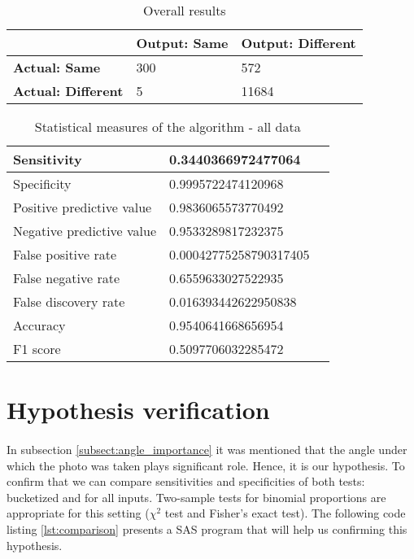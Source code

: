 \begin{table}[H]
    \centering
    \begin{spacing}{1.5}
    \begin{tabular}{|l|l|l|}
        \hline
        \cellcolor{gray} & \textbf{Output: Same} & \textbf{Output: Different} \\ [0.5ex]
        \hline\hline
        \textbf{Actual: Same} & 300 & 572 \\ [0.5ex]
        \hline
        \textbf{Actual: Different} & 5 & 11684 \\ [0.5ex]
        \hline
    \end{tabular}
    \end{spacing}
    \caption{Overall results}
    \label{tab:overall_results}
\end{table}
        
\begin{table}[H]
    \centering
    \begin{spacing}{1.5}
    \begin{tabular}{|l|l|l|}
        \hline
        Sensitivity                 & 0.3440366972477064 \\
        \hline
        Specificity                 & 0.9995722474120968 \\
        \hline
        Positive predictive value   & 0.9836065573770492 \\
        \hline
        Negative predictive value   & 0.9533289817232375 \\
        \hline
        False positive rate         & 0.00042775258790317405 \\
        \hline
        False negative rate         & 0.6559633027522935 \\
        \hline
        False discovery rate        & 0.016393442622950838 \\
        \hline
        Accuracy                    & 0.9540641668656954 \\
        \hline
        F1 score                    & 0.5097706032285472 \\
        \hline
    \end{tabular}
    \end{spacing}
    \caption{Statistical measures of the algorithm - all data}
\end{table}

\section{Hypothesis verification}
\paragraph{}
In subsection \ref{subsect:angle_importance} it was mentioned that the angle under which the photo was taken plays significant role. Hence, it is our hypothesis. To confirm that we can compare sensitivities and specificities of both tests: bucketized and for all inputs. Two-sample tests for binomial proportions are appropriate for this setting ($\chi^2$ test and Fisher's exact test)\cite{diagnostic-testing}. The following code listing \ref{lst:comparison} presents a SAS program that will help us confirming this hypothesis.

